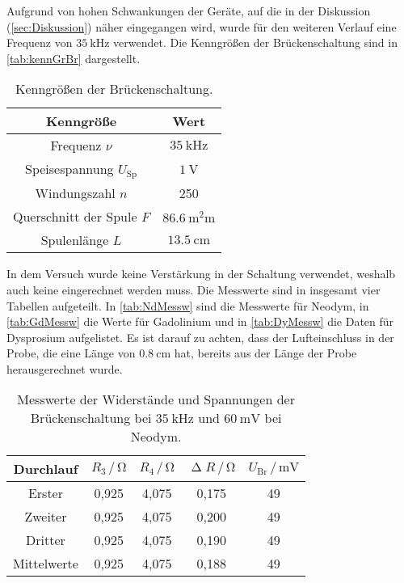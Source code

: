\noindent
Aufgrund von hohen Schwankungen der Geräte, auf die in der Diskussion (\autoref{sec:Diskussion}) näher eingegangen wird, wurde für den weiteren Verlauf eine Frequenz von $\SI{35}{\kilo\hertz}$ verwendet.
Die Kenngrößen der Brückenschaltung sind in \autoref{tab:kennGrBr} dargestellt. 
\begin{table}[H]
  \centering
  \caption{Kenngrößen der Brückenschaltung.}
  \label{tab:kennGrBr}
  \begin{tabular}{c | c}
    \toprule
    Kenngröße & Wert \\
    \midrule
    Frequenz $\nu$ & $\SI{35}{\kilo\hertz}$ \\
    Speisespannung $U_{\text{Sp}}$ & $\SI{1}{\volt}$ \\
    Windungszahl $n$ & 250 \\
    Querschnitt der Spule $F$ & $\SI{86,6}{\square\milli\meter}$ \\
    Spulenlänge $L$ & $\SI{13,5}{\centi\meter}$ \\
    \bottomrule
  \end{tabular}
\end{table}

\noindent
In dem Versuch wurde keine Verstärkung in der Schaltung verwendet, weshalb auch keine eingerechnet werden muss.
Die Messwerte sind in insgesamt vier Tabellen aufgeteilt. In \autoref{tab:NdMessw} sind die Messwerte für Neodym, in \autoref{tab:GdMessw} die Werte für Gadolinium und in \autoref{tab:DyMessw} die Daten für Dysprosium aufgelistet.
Es ist darauf zu achten, dass der Lufteinschluss in der Probe, die eine Länge von $\SI{0,8}{\centi\meter}$ hat, bereits aus der Länge der Probe herausgerechnet wurde.
\begin{table}[H]
  \centering
  \caption{Messwerte der Widerstände und Spannungen der Brückenschaltung bei $\SI{35}{\kilo\hertz}$ und $\SI{60}{\milli\volt}$ bei Neodym.}
  \label{tab:NdMessw}
  \begin{tabular}{c| c c c c}
    \toprule
    Durchlauf & $R_3 \,/\, \si{\ohm}$ & $R_4 \,/\, \si{\ohm}$ & $\upDelta R \,/\, \si{\ohm}$ & $U_{\text{Br}} \,/\, \si{\milli\volt}$ \\%
    \midrule
    Erster & 0,925 & 4,075 & 0,175 & 49 \\
    Zweiter & 0,925 & 4,075 & 0,200 & 49 \\
    Dritter & 0,925 & 4,075 & 0,190 & 49 \\
    Mittelwerte & 0,925 & 4,075 & 0,188 & 49\\
    \bottomrule
  \end{tabular}
\end{table}

